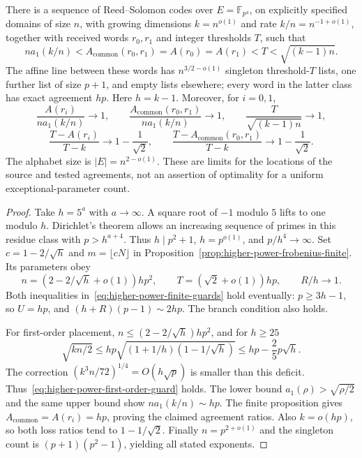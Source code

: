 \begin{theorem}\label{thm:higher-power-frobenius-window}
There is a sequence of Reed--Solomon codes over $E=\mathbb F_{p^4}$,
on explicitly specified domains of size $n$, with growing dimensions $k=n^{o(1)}$
and rate $k/n=n^{-1+o(1)}$, together with received words $r_0,r_1$ and
integer thresholds $T$, such that
\[
 n a_1(k/n)<A_{\mathrm{common}}(r_0,r_1)
 =A(r_0)=A(r_1)<T<\sqrt{(k-1)n}.
\]
The affine line between these words has $n^{3/2-o(1)}$ singleton
threshold-$T$ lists, one further list of size $p+1$, and empty lists
elsewhere; every word in the latter class has exact agreement $hp$.
Here $h=k-1$. Moreover, for $i=0,1$,
\[
 \frac{A(r_i)}{n a_1(k/n)}\longrightarrow1,\qquad
 \frac{A_{\mathrm{common}}(r_0,r_1)}{n a_1(k/n)}\longrightarrow1,
 \qquad \frac{T}{\sqrt{(k-1)n}}\longrightarrow1,
\]
\[
 \frac{T-A(r_i)}{T-k}\longrightarrow1-\frac1{\sqrt2},\qquad
 \frac{T-A_{\mathrm{common}}(r_0,r_1)}{T-k}
 \longrightarrow1-\frac1{\sqrt2}.
\]
The alphabet size is $|E|=n^{2-o(1)}$. These are limits for the
locations of the source and tested agreements, not an assertion of
optimality for a uniform exceptional-parameter count.
\end{theorem}

\begin{proof}
Take $h=5^a$ with $a\to\infty$. A square root of $-1$ modulo $5$
lifts to one modulo $h$. Dirichlet's theorem allows an increasing
sequence of primes in this residue class with $p>h^{a+4}$. Thus
$h\mid p^2+1$, $h=p^{o(1)}$, and $p/h^4\to\infty$.
Set $c=1-2/\sqrt h$ and $m=\lfloor cN\rfloor$ in
Proposition~\ref{prop:higher-power-frobenius-finite}. Its parameters obey
\[
 n=(2-2/\sqrt h+o(1))hp^2,\qquad
 T=(\sqrt2+o(1))hp,\qquad R/h\longrightarrow1.
\]
Both inequalities in~\eqref{eq:higher-power-finite-guards} hold eventually:
$p\ge3h-1$, so $U=hp$, and $(h+R)(p-1)\sim2hp$. The branch condition also holds.

For first-order placement, $n\le(2-2/\sqrt h)hp^2$, and for $h\ge25$
\[
 \sqrt{kn/2}
 \le hp\sqrt{(1+1/h)(1-1/\sqrt h)}
 \le hp-\frac25p\sqrt h.
\]
The correction $(k^3n/72)^{1/4}=O(h\sqrt p)$ is smaller than this
deficit. Thus~\eqref{eq:higher-power-first-order-guard} holds.
The lower bound $a_1(\rho)>\sqrt{\rho/2}$ and the same upper bound
show $n a_1(k/n)\sim hp$. The finite proposition gives
$A_{\mathrm{common}}=A(r_i)=hp$, proving the claimed
agreement ratios. Also $k=o(hp)$, so both loss ratios tend to
$1-1/\sqrt2$. Finally $n=p^{2+o(1)}$ and the singleton count is
$(p+1)(p^2-1)$, yielding all stated exponents.
\end{proof}

